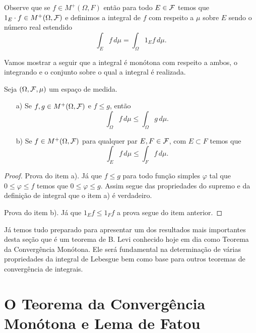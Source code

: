 Observe que se $f\in M^{+}(\Omega,F)$ então para
todo $E\in\mathcal{F}$ temos que $1_E\cdot f\in M^{+}(\Omega,\mathcal{F})$
e definimos a integral de $f$ com respeito a $\mu$ 
sobre $E$ sendo o número real estendido 
	\[
		\int_{E} f\, d\mu
		=
		\int_{\Omega} 1_{E}f\, d\mu.
	\]

Vamos mostrar a seguir que a integral é monótona 
com respeito a ambos, o integrando e o conjunto
sobre o qual a integral é realizada.






\begin{lema}
\label{lema-monotonicidade-integral-funcao-nao-negativas}
Seja $(\Omega,\mathcal{F},\mu)$ um espaço de medida.
\begin{itemize}
	\item[a)]
	Se $f,g\in M^{+}(\Omega,\mathcal{F})$	 e $f\leq g$, então 
		\[
			\int_{\Omega} f\, d\mu
			\leq
			\int_{\Omega} g\, d\mu.
		\]
	
	\item[b)] 
	Se $f\in M^{+}(\Omega,\mathcal{F})$ para 
	qualquer par $E,F\in \mathcal{F}$, com 
	$E\subset F$ temos que 
		\[
			\int_{E} f\, d\mu
			\leq
			\int_{F} f\, d\mu.
		\]
	 
\end{itemize}
\end{lema}





\begin{proof}
Prova do item a). 
Já que $f\leq g$ para todo função simples $\varphi$ 
tal que $0\leq \varphi\leq f$ temos que $0\leq \varphi\leq g$.
Assim segue das propriedades do supremo e da definição de 
integral que o item a) é verdadeiro.

Prova do item b). Já que $1_{E}f\leq 1_{F}f$
a prova segue do item anterior.
\end{proof}

\bigskip

Já temos tudo preparado para apresentar um dos resultados
mais importantes desta seção que é um teorema de B. Levi 
conhecido hoje em dia como Teorema da Convergência Monótona.
Ele será fundamental na determinação de várias propriedades
da integral de Lebesgue bem como base para outros teoremas 
de convergência de integrais. 








\section{O Teorema da Convergência Monótona e Lema de Fatou}


